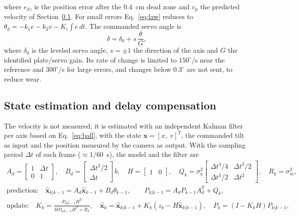 \documentclass[11pt,letterpaper]{article}
\begin{document}
where $e_{dz}$ is the position error after the 0.4~cm dead zone and
$v_p$ the predicted velocity of Section~\ref{sec:kalman}. For small
errors Eq.~\eqref{eq:law} reduces to $\theta_d=-k_1e-k_2v-K_i\int e\,dt$.
The commanded servo angle is
\begin{equation}
\delta = \delta_0 + s\,\frac{\theta}{G},
\label{eq:servo}
\end{equation}
where $\delta_0$ is the leveled servo angle, $s=\pm1$ the direction of
the axis and $G$ the identified plate/servo gain. Its rate of change is
limited to $150^\circ$/s near the reference and $300^\circ$/s for large
errors, and changes below $0.3^\circ$ are not sent, to reduce wear.

\subsection{State estimation and delay compensation}
\label{sec:kalman}
The velocity is not measured; it is estimated with an independent
Kalman filter per axis \cite{Kalman1960,BarShalom2001} based on
Eq.~\eqref{eq:ball}, with the state $\mathbf{x}=[x,\;v]^T$, the
commanded tilt as input and the position measured by the camera as
output. With the sampling period $\Delta t$ of each frame
($\approx1/60$~s), the model and the filter are
\begin{equation}
\begin{gathered}
A_d=\begin{bmatrix}1&\Delta t\\0&1\end{bmatrix},\quad
B_d=\begin{bmatrix}\Delta t^2/2\\ \Delta t\end{bmatrix}b,\quad
H=\begin{bmatrix}1&0\end{bmatrix},\quad
Q_k=\sigma_a^2\begin{bmatrix}\Delta t^4/4&\Delta t^3/2\\ \Delta t^3/2&\Delta t^2\end{bmatrix},\quad
R_k=\sigma_m^2,\\[1mm]
\text{prediction:}\quad
\hat{\mathbf{x}}_{k|k-1}=A_d\hat{\mathbf{x}}_{k-1}+B_d\theta_{k-1},\qquad
P_{k|k-1}=A_dP_{k-1}A_d^T+Q_k,\\[1mm]
\text{update:}\quad
K_k=\frac{P_{k|k-1}H^T}{HP_{k|k-1}H^T+R_k},\quad
\hat{\mathbf{x}}_{k}=\hat{\mathbf{x}}_{k|k-1}+K_k\left(z_k-H\hat{\mathbf{x}}_{k|k-1}\right),\quad
P_k=(I-K_kH)P_{k|k-1},
\end{gathered}
\label{eq:kalman}
\end{equation}
\end{document}
